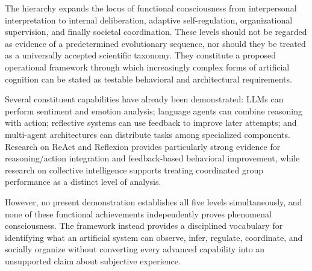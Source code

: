 The hierarchy expands the locus of functional consciousness from interpersonal interpretation to internal deliberation, adaptive self-regulation, organizational supervision, and finally societal coordination. These levels should not be regarded as evidence of a predetermined evolutionary sequence, nor should they be treated as a universally accepted scientific taxonomy. They constitute a proposed operational framework through which increasingly complex forms of artificial cognition can be stated as testable behavioral and architectural requirements.

Several constituent capabilities have already been demonstrated: LLMs can perform sentiment and emotion analysis; language agents can combine reasoning with action; reflective systems can use feedback to improve later attempts; and multi-agent architectures can distribute tasks among specialized components. Research on ReAct and Reflexion provides particularly strong evidence for reasoning/action integration and feedback-based behavioral improvement, while research on collective intelligence supports treating coordinated group performance as a distinct level of analysis.

However, no present demonstration establishes all five levels simultaneously, and none of these functional achievements independently proves phenomenal consciousness. The framework instead provides a disciplined vocabulary for identifying what an artificial system can observe, infer, regulate, coordinate, and socially organize without converting every advanced capability into an unsupported claim about subjective experience.